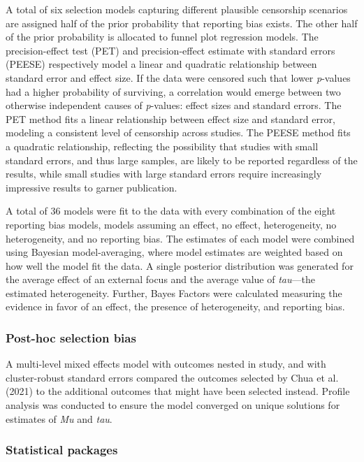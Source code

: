 \documentclass[
  11pt,
  doc, donotrepeattitle,floatsintext]{apa7}
\begin{document}
A total of six selection models capturing different plausible censorship scenarios are assigned half of the prior probability that reporting bias exists. The other half of the prior probability is allocated to funnel plot regression models. The precision-effect test (PET) and precision-effect estimate with standard errors (PEESE) respectively model a linear and quadratic relationship between standard error and effect size. If the data were censored such that lower \emph{p}-values had a higher probability of surviving, a correlation would emerge between two otherwise independent causes of \emph{p}-values: effect sizes and standard errors. The PET method fits a linear relationship between effect size and standard error, modeling a consistent level of censorship across studies. The PEESE method fits a quadratic relationship, reflecting the possibility that studies with small standard errors, and thus large samples, are likely to be reported regardless of the results, while small studies with large standard errors require increasingly impressive results to garner publication.

A total of 36 models were fit to the data with every combination of the eight reporting bias models, models assuming an effect, no effect, heterogeneity, no heterogeneity, and no reporting bias. The estimates of each model were combined using Bayesian model-averaging, where model estimates are weighted based on how well the model fit the data. A single posterior distribution was generated for the average effect of an external focus and the average value of \emph{tau}---the estimated heterogeneity. Further, Bayes Factors were calculated measuring the evidence in favor of an effect, the presence of heterogeneity, and reporting bias.

\hypertarget{post-hoc-selection-bias}{%
\subsubsection{Post-hoc selection bias}\label{post-hoc-selection-bias}}

A multi-level mixed effects model with outcomes nested in study, and with cluster-robust standard errors compared the outcomes selected by Chua et al. (2021) to the additional outcomes that might have been selected instead. Profile analysis was conducted to ensure the model converged on unique solutions for estimates of \emph{Mu} and \emph{tau}.

\hypertarget{statistical-packages}{%
\subsubsection{Statistical packages}\label{statistical-packages}}
\end{document}
